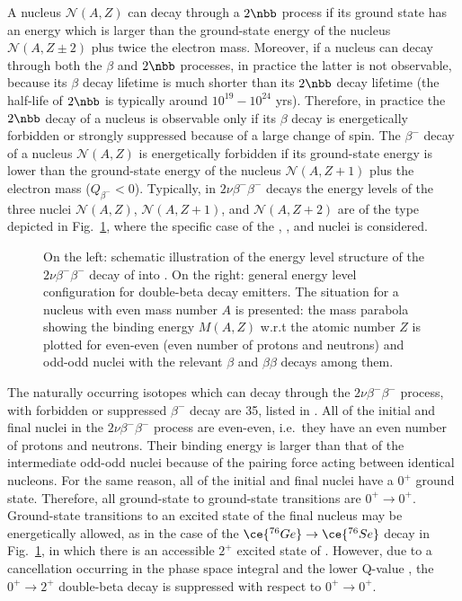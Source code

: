 A nucleus $\mathcal{N}(A,Z)$ can decay through a $2\nbb$ process if its ground state has an energy which is larger than the ground-state energy of the nucleus $\mathcal{N}(A,Z\pm2)$ plus twice the electron mass. Moreover, if a nucleus can decay through both the $\beta$ and $2\nbb$ processes, in practice the latter is not observable, because its $\beta$ decay lifetime is much shorter than its $2\nbb$ decay lifetime (the half-life of $2\nbb$ is typically around $10^{19}-10^{24}$ yrs). Therefore, in practice the $2\nbb$ decay of a nucleus is observable only if its $\beta$ decay is energetically forbidden or strongly suppressed because of a large change of spin. The $\beta^-$ decay of a nucleus $\mathcal{N}(A,Z)$ is energetically forbidden if its ground-state energy is lower than the ground-state energy of the nucleus $\mathcal{N}(A,Z+1)$ plus the electron mass ($Q_{\beta^{-}}<0$). Typically, in $2\nu\beta^-\beta^-$ decays the energy levels of the three nuclei $\mathcal{N}(A,Z)$, $\mathcal{N}(A,Z+1)$, and $\mathcal{N}(A,Z+2)$ are of the type depicted in Fig.~\ref{fig:levelsGe76}, where the specific case of the , , and  nuclei is considered.
\begin{figure}
	\centering
	\makebox[\textwidth]{%
	}%
	\caption{On the left: schematic illustration of the energy level structure of the $2\nu\beta^-\beta^-$ decay of  into . On the right: general energy level configuration for double-beta decay emitters. The situation for a nucleus with even mass number $A$ is presented: the mass parabola showing the binding energy $M(A,Z)$ w.r.t the atomic number $Z$ is plotted for even-even (even number of protons and neutrons) and odd-odd nuclei with the relevant $\beta$ and $\beta\beta$ decays among them.}
	\label{fig:levelsGe76}
\end{figure}

The naturally occurring isotopes which can decay through the $2\nu\beta^-\beta^-$ process, with forbidden or suppressed $\beta^-$ decay are 35, listed in \cite{Giunti:2007ry}. All of the initial and final nuclei in the $2\nu\beta^-\beta^-$ process are even-even, i.e.~they have an even number of protons and neutrons. Their binding energy is larger than that of the intermediate odd-odd nuclei because of the pairing force acting between identical nucleons. For the same reason, all of the initial and final nuclei have a $0^+$ ground state. Therefore, all ground-state to ground-state transitions are $0^+\rightarrow0^+$. Ground-state transitions to an excited state of the final nucleus may be energetically allowed, as in the case of the $\ce{^{76}Ge}\rightarrow\ce{^{76}Se}$ decay in Fig.~\ref{fig:levelsGe76}, in which there is an accessible $2^+$ excited state of . However, due to a cancellation occurring in the phase space integral and the lower Q-value \cite{Tomoda:1991}, the $0^+\rightarrow2^+$ double-beta decay is suppressed with respect to $0^+\rightarrow0^+$.

